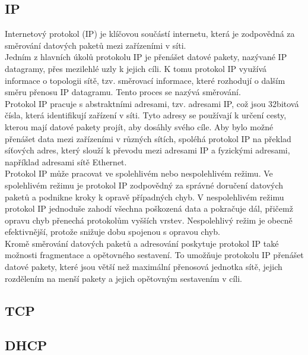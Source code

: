 \documentclass[12pt]{report}			%
\begin{document}
\cite{arp_1}
\cite{arp_2}
\cite{arp_3}

				\subsection{IP}
Internetový protokol (IP) je klíčovou součástí internetu, která je zodpovědná za směrování datových paketů mezi zařízeními v síti.
\\
Jedním z hlavních úkolů protokolu IP je přenášet datové pakety, nazývané IP datagramy, přes mezilehlé uzly k jejich cíli. K tomu protokol IP využívá informace o topologii sítě, tzv. směrovací informace, které rozhodují o dalším směru přenosu IP datagramu. Tento proces se nazývá směrování.
\\
Protokol IP pracuje s abstraktními adresami, tzv. adresami IP, což jsou 32bitová čísla, která identifikují zařízení v síti. Tyto adresy se používají k určení cesty, kterou mají datové pakety projít, aby dosáhly svého cíle. Aby bylo možné přenášet data mezi zařízeními v různých sítích, spoléhá protokol IP na překlad síťových adres, který slouží k převodu mezi adresami IP a fyzickými adresami, například adresami sítě Ethernet.
\\
Protokol IP může pracovat ve spolehlivém nebo nespolehlivém režimu. Ve spolehlivém režimu je protokol IP zodpovědný za správné doručení datových paketů a podnikne kroky k opravě případných chyb. V nespolehlivém režimu protokol IP jednoduše zahodí všechna poškozená data a pokračuje dál, přičemž opravu chyb přenechá protokolům vyšších vrstev. Nespolehlivý režim je obecně efektivnější, protože snižuje dobu spojenou s opravou chyb.
\\
Kromě směrování datových paketů a adresování poskytuje protokol IP také možnosti fragmentace a opětovného sestavení. To umožňuje protokolu IP přenášet datové pakety, které jsou větší než maximální přenosová jednotka sítě, jejich rozdělením na menší pakety a jejich opětovným sestavením v cíli.


\cite{IP_1}
\cite{IP_2}
\cite{IP_3}
\cite{IP_4}

				\subsection{TCP}

\url{}
\url{}
\url{}
\url{}

				\subsection{DHCP}
\end{document}
